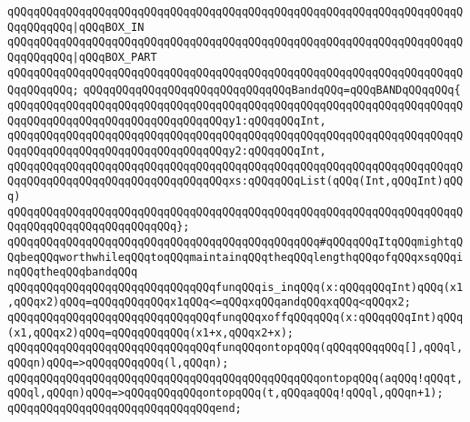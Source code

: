 \verb|qQQqqQQqqQQqqQQqqQQqqQQqqQQqqQQqqQQqqQQqqQQqqQQqqQQqqQQqqQQqqQQqqQQqqQQqqQQqqQQq|\verb#|qQQqBOX_IN#\newline
\verb|qQQqqQQqqQQqqQQqqQQqqQQqqQQqqQQqqQQqqQQqqQQqqQQqqQQqqQQqqQQqqQQqqQQqqQQqqQQqqQQq|\verb#|qQQqBOX_PART#\newline
\verb|qQQqqQQqqQQqqQQqqQQqqQQqqQQqqQQqqQQqqQQqqQQqqQQqqQQqqQQqqQQqqQQqqQQqqQQqqQQqqQQq;|\newline
\newline
\verb|qQQqqQQqqQQqqQQqqQQqqQQqqQQqqQQqBandqQQq=qQQqBANDqQQqqQQq{|\newline
\verb|qQQqqQQqqQQqqQQqqQQqqQQqqQQqqQQqqQQqqQQqqQQqqQQqqQQqqQQqqQQqqQQqqQQqqQQqqQQqqQQqqQQqqQQqqQQqqQQqqQQqqQQqy1:qQQqqQQqInt,|\newline
\verb|qQQqqQQqqQQqqQQqqQQqqQQqqQQqqQQqqQQqqQQqqQQqqQQqqQQqqQQqqQQqqQQqqQQqqQQqqQQqqQQqqQQqqQQqqQQqqQQqqQQqqQQqy2:qQQqqQQqInt,|\newline
\verb|qQQqqQQqqQQqqQQqqQQqqQQqqQQqqQQqqQQqqQQqqQQqqQQqqQQqqQQqqQQqqQQqqQQqqQQqqQQqqQQqqQQqqQQqqQQqqQQqqQQqqQQqxs:qQQqqQQqList(qQQq(Int,qQQqInt)qQQq)|\newline
\verb|qQQqqQQqqQQqqQQqqQQqqQQqqQQqqQQqqQQqqQQqqQQqqQQqqQQqqQQqqQQqqQQqqQQqqQQqqQQqqQQqqQQqqQQqqQQqqQQq};|\newline
\newline
\verb|qQQqqQQqqQQqqQQqqQQqqQQqqQQqqQQqqQQqqQQqqQQqqQQq#qQQqqQQqItqQQqmightqQQqbeqQQqworthwhileqQQqtoqQQqmaintainqQQqtheqQQqlengthqQQqofqQQqxsqQQqinqQQqtheqQQqbandqQQq|\newline
\newline
\newline
\newline
\verb|qQQqqQQqqQQqqQQqqQQqqQQqqQQqqQQqfunqQQqis_inqQQq(x:qQQqqQQqInt)qQQq(x1,qQQqx2)qQQq=qQQqqQQqqQQqx1qQQq<=qQQqxqQQqandqQQqxqQQq<qQQqx2;|\newline
\verb|qQQqqQQqqQQqqQQqqQQqqQQqqQQqqQQqfunqQQqxoffqQQqqQQq(x:qQQqqQQqInt)qQQq(x1,qQQqx2)qQQq=qQQqqQQqqQQq(x1+x,qQQqx2+x);|\newline
\newline
\verb|qQQqqQQqqQQqqQQqqQQqqQQqqQQqqQQqfunqQQqontopqQQq(qQQqqQQqqQQq[],qQQql,qQQqn)qQQq=>qQQqqQQqqQQq(l,qQQqn);|\newline
\verb|qQQqqQQqqQQqqQQqqQQqqQQqqQQqqQQqqQQqqQQqqQQqqQQqontopqQQq(aqQQq!qQQqt,qQQql,qQQqn)qQQq=>qQQqqQQqqQQqontopqQQq(t,qQQqaqQQq!qQQql,qQQqn+1);|\newline
\verb|qQQqqQQqqQQqqQQqqQQqqQQqqQQqqQQqend;|\newline
\newline

